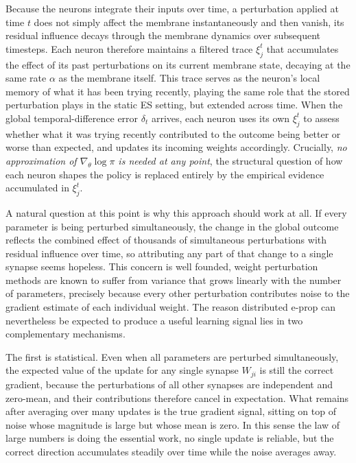     Because the neurons integrate their inputs over time, a perturbation applied at time $t$ does
    not simply affect the membrane instantaneously and then vanish, its residual influence decays
    through the membrane dynamics over subsequent timesteps. Each neuron therefore maintains
    a filtered trace $\xi_j^t$ that accumulates the effect of its past perturbations on its
    current membrane state, decaying at the same rate $\alpha$ as the membrane itself. This
    trace serves as the neuron's local memory of what it has been trying recently, playing
    the same role that the stored perturbation plays in the static ES setting, but extended
    across time. When the global temporal-difference error $\delta_t$ arrives, each neuron
    uses its own $\xi_j^t$ to assess whether what it was trying recently contributed to the
    outcome being better or worse than expected, and updates its incoming weights accordingly.
    Crucially, \emph{no approximation of $\nabla_\theta \log \pi$ is needed at any point}, the
    structural question of how each neuron shapes the policy is replaced entirely by the
    empirical evidence accumulated in $\xi_j^t$.

    A natural question at this point is why this approach should work at all. If every
    parameter is being perturbed simultaneously, the change in the global outcome reflects
    the combined effect of thousands of simultaneous perturbations with residual influence over time, so attributing any part
    of that change to a single synapse seems hopeless. This concern is well founded, weight perturbation methods are known to suffer from variance that grows
    linearly with the number of parameters, precisely because every other perturbation
    contributes noise to the gradient estimate of each individual weight. The reason
    distributed e-prop can nevertheless be expected to produce a useful learning signal lies
    in two complementary mechanisms.
    
    The first is statistical. Even when all parameters are perturbed simultaneously, the
    expected value of the update for any single synapse $W_{ji}$ is still the correct
    gradient, because the perturbations of all other synapses are independent and
    zero-mean, and their contributions therefore cancel in expectation. What remains after
    averaging over many updates is the true gradient signal, sitting on top of noise whose
    magnitude is large but whose mean is zero. In this sense the law of large numbers is
    doing the essential work, no single update is reliable, but the correct direction
    accumulates steadily over time while the noise averages away.
    
